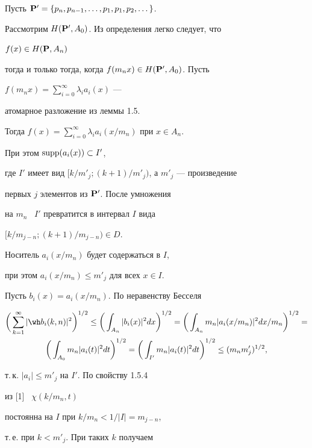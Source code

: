 \begin{pf}


Пусть ${\bold P}'=\{p_n,p_{n-1},\dotsc,p_1,p_1,p_2,\dotsc\}$.


Рассмотрим $H({\bold P}',A_0)$. Из определения легко следует, что


$f(x)\in H({\bold P},A_n)$


тогда и только тогда, когда $f(m_nx)\in H({\bold P}',A_0)$. Пусть 


$f(m_nx)=\sum\limits^{\infty}_{i=0}\lambda_ia_i(x)$ ---


атомарное разложение из леммы 1.5. 


Тогда $f(x)=\sum\limits^{\infty}_{i=0}\lambda_ia_i(x/m_n)$ при $x\in A_n$. 


При этом $\operatorname{supp} (a_i(x))\subset I'$,


где $I'$ имеет вид $[k/m'_j;(k+1)/m'_j)$, а $m'_j$ --- произведение 


первых $j$ элементов из ${\bold P}'$. После умножения


на $m_n$ \ $I'$ превратится в интервал $I$ вида


$[k/m_{j-n};(k+1)/m_{j-n})\in D$. 


Носитель $a_i(x/m_n)$ будет содержаться в $I$,


при этом $a_i(x/m_n)\leq m'_j$ для всех $x\in I$.





Пусть $b_i(x)=a_i(x/m_n)$. По неравенству Бесселя 


\begin{multline*}


\bigg(\sum_{k=1}^{\infty}|{\wh b}_i(k,n)|^2\bigg)^{1/2}\leq


\bigg(\int_{A_n}|b_i(x)|^2dx\bigg)^{1/2}=


\bigg(\int_{A_n}m_n|a_i(x/m_n)|^2dx/m_n\bigg)^{1/2}= \\


%


\bigg(\int_{A_0}m_n|a_i(t)|^2dt\bigg)^{1/2}=


\bigg(\int_{I'}m_n|a_i(t)|^2dt\bigg)^{1/2}\leq (m_nm'_j)^{1/2},


\end{multline*}


т.\,к. $|a_i|\leq m'_j$ на $I'$. По свойству 1.5.4


из [1] \ $\chi(k/m_n,t)$ 


постоянна на $I$ при $k/m_n<1/|I|=m_{j-n}$, 


т.\,е. при $k<m'_j$. При таких $k$ получаем



\end{pf}
